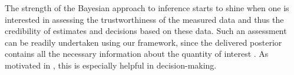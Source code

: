 The strength of the Bayesian approach to inference starts to shine when one is
interested in assessing the trustworthiness of the measured data and thus the
credibility of estimates and decisions based on these data. Such an assessment
can be readily undertaken using our framework, since the delivered posterior
contains all the necessary information about the quantity of interest \g. As
motivated in , this is especially helpful in
decision-making.
